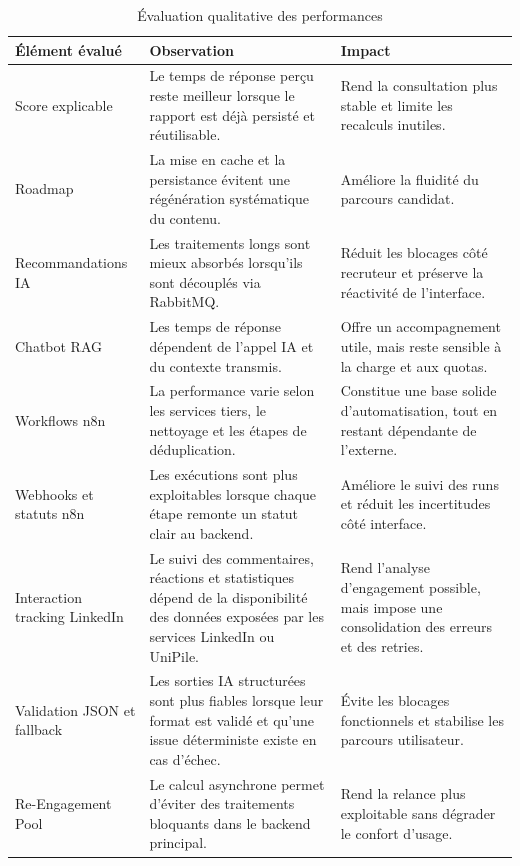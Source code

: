\begin{table}[H]
\centering
\small
\renewcommand{\arraystretch}{1.3}
\begin{tabular}{|p{3.6cm}|p{5.4cm}|p{4.4cm}|}
\hline
\rowcolor{headerblue}
\textbf{Élément évalué} & \textbf{Observation} & \textbf{Impact} \\
\hline
Score explicable & Le temps de réponse perçu reste meilleur lorsque le rapport est déjà persisté et réutilisable. & Rend la consultation plus stable et limite les recalculs inutiles. \\
\hline
Roadmap & La mise en cache et la persistance évitent une régénération systématique du contenu. & Améliore la fluidité du parcours candidat. \\
\hline
Recommandations IA & Les traitements longs sont mieux absorbés lorsqu'ils sont découplés via RabbitMQ. & Réduit les blocages côté recruteur et préserve la réactivité de l'interface. \\
\hline
Chatbot RAG & Les temps de réponse dépendent de l'appel IA et du contexte transmis. & Offre un accompagnement utile, mais reste sensible à la charge et aux quotas. \\
\hline
Workflows n8n & La performance varie selon les services tiers, le nettoyage et les étapes de déduplication. & Constitue une base solide d'automatisation, tout en restant dépendante de l'externe. \\
\hline
Webhooks et statuts n8n & Les exécutions sont plus exploitables lorsque chaque étape remonte un statut clair au backend. & Améliore le suivi des runs et réduit les incertitudes côté interface. \\
\hline
Interaction tracking LinkedIn & Le suivi des commentaires, réactions et statistiques dépend de la disponibilité des données exposées par les services LinkedIn ou UniPile. & Rend l'analyse d'engagement possible, mais impose une consolidation des erreurs et des retries. \\
\hline
Validation JSON et fallback & Les sorties IA structurées sont plus fiables lorsque leur format est validé et qu'une issue déterministe existe en cas d'échec. & Évite les blocages fonctionnels et stabilise les parcours utilisateur. \\
\hline
Re-Engagement Pool & Le calcul asynchrone permet d'éviter des traitements bloquants dans le backend principal. & Rend la relance plus exploitable sans dégrader le confort d'usage. \\
\hline
\end{tabular}
\normalsize
\caption{Évaluation qualitative des performances}
\end{table}

